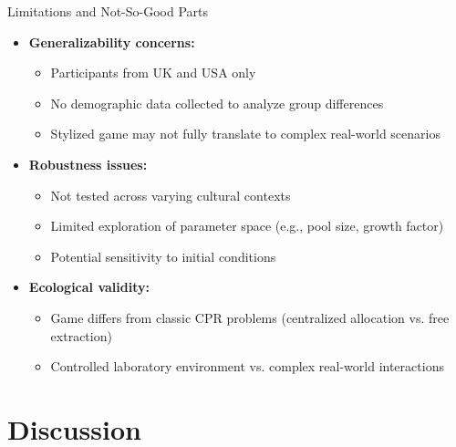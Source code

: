 \documentclass[aspectratio=169]{beamer} %
\begin{document}
\begin{frame}{Limitations and Not-So-Good Parts}
\begin{itemize}
    \item \textbf{Generalizability concerns:}
    \begin{itemize}
        \item Participants from UK and USA only
        \item No demographic data collected to analyze group differences
        \item Stylized game may not fully translate to complex real-world scenarios
    \end{itemize}
    
    \item \textbf{Robustness issues:}
    \begin{itemize}
        \item Not tested across varying cultural contexts
        \item Limited exploration of parameter space (e.g., pool size, growth factor)
        \item Potential sensitivity to initial conditions
    \end{itemize}
    
    \item \textbf{Ecological validity:}
    \begin{itemize}
        \item Game differs from classic CPR problems (centralized allocation vs. free extraction)
        \item Controlled laboratory environment vs. complex real-world interactions
    \end{itemize}
\end{itemize}
\end{frame}

\section{Discussion}
\end{document}
